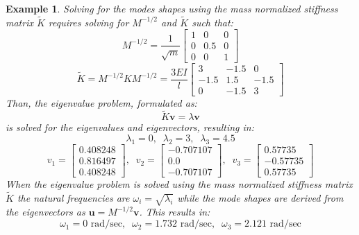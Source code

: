 \documentclass[12pt,letter]{article}
\newtheorem{ex}{Example}
\numberwithin{ex}{section} %
\newenvironment{example}{\begin{mdframed}[middlelinewidth=0.5mm]\begin{ex}\normalfont}{\end{ex}\end{mdframed}}
\numberwithin{re}{section} %
\begin{document}
\begin{example}
Solving for the modes shapes using the  mass normalized stiffness matrix $\tilde{K}$ requires solving for $M^{-1/2}$ and $\tilde{K}$ such that:
\begin{equation}
	  M^{-1/2} = \frac{1}{\sqrt{m}} \begin{bmatrix} 1 & 0 & 0 \\    0  & 0.5 & 0 \\ 0  & 0 & 1 \end{bmatrix}
\end{equation}
\begin{equation}
	   \tilde{K} = M^{-1/2} K M^{-1/2} = \frac{3EI}{l} \begin{bmatrix} 3 & -1.5 & 0 \\  -1.5  & 1.5 & -1.5 \\  0  & -1.5 & 3 \end{bmatrix} 
\end{equation}
Than, the eigenvalue problem, formulated as:
\begin{equation}
\tilde{K} \textbf{v} = \lambda \textbf{v}
\end{equation}
is solved for the eigenvalues and eigenvectors, resulting in:
\begin{equation}
\lambda_1 = 0, \; \; \lambda_2 = 3, \; \; \lambda_3 = 4.5
\end{equation}
\begin{equation}
v_1 = \begin{bmatrix} 0.408248 \\    0.816497 \\    0.408248  \end{bmatrix}, \; \; v_2 = \begin{bmatrix} -0.707107 \\    0.0 \\    -0.707107 \end{bmatrix}, \; \; v_3 = \begin{bmatrix} 0.57735 \\    -0.57735 \\    0.57735  \end{bmatrix}
\end{equation}
When the eigenvalue problem is solved using the mass normalized stiffness matrix $\tilde{K}$ the natural frequencies are $\omega_i = \sqrt{\lambda_i}$ while the mode shapes are derived from the eigenvectors as $\textbf{u}=M^{-1/2}\textbf{v}$. This results in:
\begin{equation}
\omega_1 = 0  \text{ rad/sec}, \; \; \omega_2 = 1.732 \text{ rad/sec}, \; \; \omega_3 = 2.121  \text{ rad/sec}

\end{equation}
\end{example}
\end{document}
